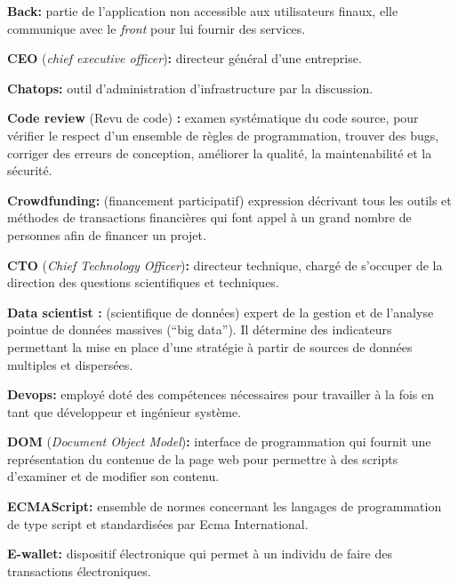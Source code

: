 \textbf{Back:} partie de l'application non accessible aux utilisateurs
finaux, elle communique avec le \emph{front} pour lui fournir des
services.

\bigskip

\textbf{CEO} (\emph{chief executive officer})\textbf{:} directeur
général d'une entreprise.

\bigskip

\textbf{Chatops:} outil d'administration d'infrastructure par la
discussion.

\bigskip

\textbf{Code review} (Revu de code) \textbf{:} examen systématique du
code source, pour vérifier le respect d'un ensemble de règles de
programmation, trouver des bugs, corriger des erreurs de conception,
améliorer la qualité, la maintenabilité et la sécurité.

\bigskip

\textbf{Crowdfunding:} (financement participatif) expression décrivant
tous les outils et méthodes de transactions financières qui font appel à
un grand nombre de personnes afin de financer un projet.

\bigskip

\textbf{CTO} (\emph{Chief Technology Officer})\textbf{:} directeur
technique, chargé de s'occuper de la direction des questions
scientifiques et techniques.

\bigskip

\textbf{Data scientist :} (scientifique de données) expert de la gestion
et de l'analyse pointue de données massives (``big data''). Il détermine
des indicateurs permettant la mise en place d'une stratégie à partir de
sources de données multiples et dispersées.

\bigskip

\textbf{Devops:} employé doté des compétences nécessaires pour
travailler à la fois en tant que développeur et ingénieur système.

\bigskip

\textbf{DOM} (\emph{Document Object Model})\textbf{:} interface de
programmation qui fournit une représentation du contenue de la page web
pour permettre à des scripts d'examiner et de modifier son contenu.

\bigskip

\textbf{ECMAScript:} ensemble de normes concernant les langages de
programmation de type script et standardisées par Ecma International.

\bigskip

\textbf{E-wallet:} dispositif électronique qui permet à un individu de
faire des transactions électroniques.

